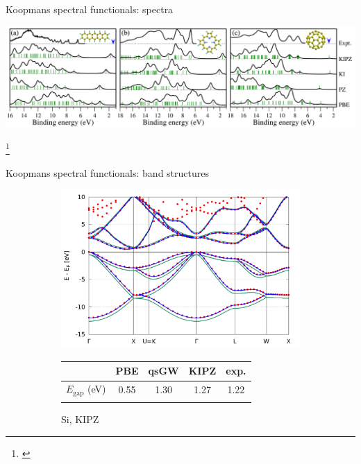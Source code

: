 \documentclass[xcolor=table,aspectratio=169]{beamer}
\newcommand\blfootcite[1]{%
  \begingroup
  \renewcommand\thefootnote{}\footnote{\hspace{-4ex}\cite{#1}}%
  \addtocounter{footnote}{-1}%
  \endgroup
}
\numberwithin{equation}{section}
\begin{document}
\begin{frame}{Koopmans spectral functionals: spectra}
   \begin{center}
      \includegraphics[height=0.5\textheight]{figures/fig_nguyen_prl_spectra.png}
   \end{center}
   \blfootcite{Nguyen2015}
\end{frame}

\begin{frame}{\normalsize Koopmans spectral functionals: band structures}
   \begin{figure}[t]
      \centering
      \begin{subfigure}{0.45\textwidth}
         \includegraphics[width=\columnwidth]{figures/Si_kipz_bands.png}
         \caption{Si, KIPZ}
         \footnotesize
         \begin{tabularx}{\columnwidth}{l C C C C}
                                  & PBE  & qsGW & KIPZ & exp. \\
            \hline
            $E_\mathrm{gap}$ (eV) & 0.55 & 1.30 & 1.27 & 1.22 \\
            \vphantom{Test}
         \end{tabularx}
      \end{subfigure}
      \begin{subfigure}{0.45\textwidth}

\end{subfigure}
\end{figure}
\end{frame}
\end{document}
